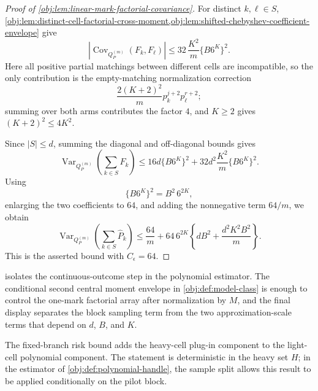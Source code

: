 \documentclass[11pt]{article}
\begin{document}
\begin{proof}[Proof of \cref{obj:lem:linear-mark-factorial-covariance}]
For distinct \(k,\ell\in S\), \cref{obj:lem:distinct-cell-factorial-cross-moment,obj:lem:shifted-chebyshev-coefficient-envelope} give
\[
\left|\operatorname{Cov}_{Q_P^{(m)}}(F_k,F_\ell)\right|
\le
32\,\frac{K^2}{m}\{B6^K\}^2 .
\]
Here all positive partial matchings between different cells are incompatible, so the only contribution is the empty-matching normalization correction
\[
\frac{2(K+2)^2}{m}p_k^{j+2}p_\ell^{r+2};
\]
summing over both arms contributes the factor \(4\), and \(K\ge2\) gives \((K+2)^2\le4K^2\).

Since \(|S|\le d\), summing the diagonal and off-diagonal bounds gives
\[
\operatorname{Var}_{Q_P^{(m)}}\!\left(\sum_{k\in S}F_k\right)
\le
16d\{B6^K\}^2
+
32d^2\frac{K^2}{m}\{B6^K\}^2 .
\]
Using
\[
\{B6^K\}^2=B^2\,6^{2K},
\]
enlarging the two coefficients to \(64\), and adding the nonnegative term \(64/m\), we obtain
\[
\operatorname{Var}_{Q_P^{(m)}}\!\left(\sum_{k\in S}\widehat P_k\right)
\le
\frac{64}{m}
+
64\,6^{2K}
\left\{
dB^2+\frac{d^2K^2B^2}{m}
\right\}.
\]
This is the asserted bound with \(C_\epsilon=64\).
\end{proof}

 isolates the continuous-outcome step in the polynomial estimator. The conditional second central moment envelope in \cref{obj:def:model-class} is enough to control the one-mark factorial array after normalization by \(M\), and the final display separates the block sampling term from the two approximation-scale terms that depend on \(d\), \(B\), and \(K\).

The fixed-branch risk bound adds the heavy-cell plug-in component to the light-cell polynomial component. The statement is deterministic in the heavy set \(H\); in the estimator of \cref{obj:def:polynomial-handle}, the sample split allows this result to be applied conditionally on the pilot block.
\end{document}
